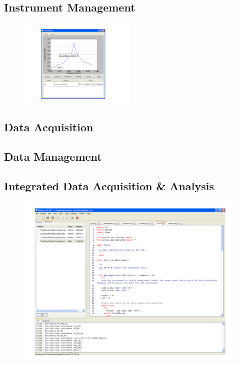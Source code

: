 
\subsection{Instrument Management}



\begin{figure}
	\centering
	\includegraphics[width=0.5\textwidth]{./material_thesis/python_frontpanel}
	\caption[]{}
	\label{fig:python_frontpanel}
\end{figure}

\subsection{Data Acquisition}


\subsection{Data Management}


\subsection{Integrated Data Acquisition \& Analysis}


\begin{figure}[ht!]
	\centering
	\includegraphics[width=\textwidth]{./material_thesis/python_lab_ide}
	\caption[]{}
	\label{fig:python_ide}
\end{figure}